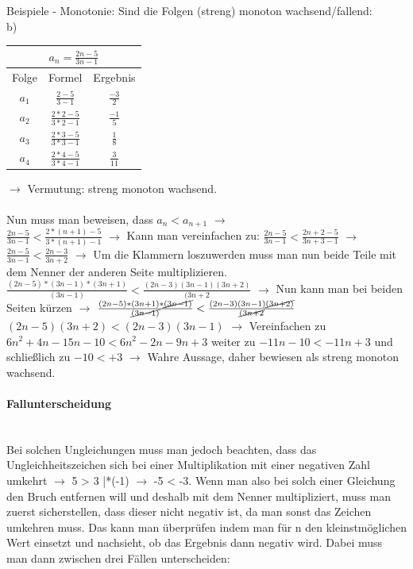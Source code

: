 \documentclass{article}
\newcommand{\paragraphlb}[1]{\paragraph{#1}\mbox{}\\}
\begin{document}
	\subsubsection{}{Beispiele - Monotonie:}
	Sind die Folgen (streng) monoton wachsend/fallend: \\
	b) \\
	\begin{tabular}{| c | c | c |}
		\toprule
		\multicolumn{3}{|c|}{$a_n=\frac{2n-5}{3n-1}$} \\ \hline
		Folge & Formel & Ergebnis \\ \midrule
		$a_1$ & $\frac{2-5}{3-1}$ & $\frac{-3}{2}$ \\
		$a_2$ & $\frac{2*2-5}{3*2-1}$ & $\frac{-1}{5}$ \\
		$a_3$ & $\frac{2*3-5}{3*3-1}$ & $\frac{1}{8}$ \\
		$a_4$ & $\frac{2*4-5}{3*4-1}$ & $\frac{3}{11}$ \\
		\bottomrule
	\end{tabular}
	$\to$ Vermutung: streng monoton wachsend. \\ \\
	Nun muss man beweisen, dass $a_n<a_{n+1}$ $\to$ \\
	$\frac{2n-5}{3n-1} < \frac{2*(n+1)-5}{3*(n+1)-1}$ $\to$ Kann man vereinfachen zu: $\frac{2n-5}{3n-1} < \frac{2n+2-5}{3n+3-1}$ $\to$ $\frac{2n-5}{3n-1} < \frac{2n-3}{3n+2}$ $\to$ Um die Klammern loszuwerden muss man nun beide Teile mit dem Nenner der anderen Seite multiplizieren. \\
	$\frac{(2n-5)*(3n-1)*(3n+1)}{(3n-1)}<\frac{(2n-3)(3n-1)(3n+2)}{(3n+2}$ $\to$ Nun kann man bei beiden Seiten kürzen $\to$ 
	$\frac{(2n-5)*(3n+1)*\cancel{(3n-1)}}{\cancel{(3n-1)}}<\frac{(2n-3)(3n-1)\cancel{(3n+2)}}{\cancel{(3n+2}}$ \\
	$(2n-5)(3n+2)<(2n-3)(3n-1)$ $\to$ Vereinfachen zu $6n^2+4n-15n-10<6n^2-2n-9n+3$ weiter zu $-11n-10<-11n+3$ und schließlich zu $-10<+3$ $\to$ Wahre Aussage, daher bewiesen als streng monoton wachsend. \\
	\paragraphlb{Fallunterscheidung}
	Bei solchen Ungleichungen muss man jedoch beachten, dass das Ungleichheitszeichen sich bei einer Multiplikation mit einer negativen Zahl umkehrt $\to$ 5 > 3 |*(-1) $\to$ -5 < -3. Wenn man also bei solch einer Gleichung den Bruch entfernen will und deshalb mit dem Nenner multipliziert, muss man zuerst sicherstellen, dass dieser nicht negativ ist, da man sonst das Zeichen umkehren muss. Das kann man überprüfen indem man für n den kleinstmöglichen Wert einsetzt und nachsieht, ob das Ergebnis dann negativ wird. Dabei muss man dann zwischen drei Fällen unterscheiden:
\end{document}
